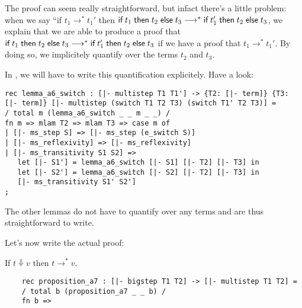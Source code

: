 The \beluga proof can seem really straightforward, but infact there's a little
problem: when we say ``if $t_1 \longrightarrow^* t_1'$ then
$\textsf{if\;} t_1 \textsf{\;then\;} t_2 \textsf{\;else\;} t_3 \longrightarrow^* \textsf{if\;} t_1' \textsf{\;then\;} t_2 \textsf{\;else\;} t_3$, we explain that
we are able to produce a proof that $\textsf{if\;} t_1 \textsf{\;then\;} t_2 \textsf{\;else\;} t_3 \longrightarrow^*
\textsf{if\;} t_1' \textsf{\;then\;} t_2 \textsf{\;else\;} t_3$ if we have a proof that $t_1 \longrightarrow^* t_1'$. By
doing so, we implicitely quantify over the terms $t_2$ and $t_3$.

In \beluga, we will have to write this quantification explicitely. Have a look:

\begin{lstlisting}
rec lemma_a6_switch : [|- multistep T1 T1'] -> {T2: [|- term]} {T3: [|- term]} [|- multistep (switch T1 T2 T3) (switch T1' T2 T3)] =
/ total m (lemma_a6_switch _ _ m _ _) /
fn m => mlam T2 => mlam T3 => case m of 
| [|- ms_step S] => [|- ms_step (e_switch S)]
| [|- ms_reflexivity] => [|- ms_reflexivity]
| [|- ms_transitivity S1 S2] =>
   let [|- S1'] = lemma_a6_switch [|- S1] [|- T2] [|- T3] in
   let [|- S2'] = lemma_a6_switch [|- S2] [|- T2] [|- T3] in
   [|- ms_transitivity S1' S2']
;
\end{lstlisting}


The other lemmas do not have to quantify over any terms and are thus
straightforward to write.

Let's now write the actual proof:
\begin{proposition}[A7]
  If $t \Downarrow v$ then $t \longrightarrow^* v.$
  \begin{lstlisting}
    rec proposition_a7 : [|- bigstep T1 T2] -> [|- multistep T1 T2] =
    / total b (proposition_a7 _ _ b) /
    fn b =>
  \end{lstlisting}
\end{proposition}

